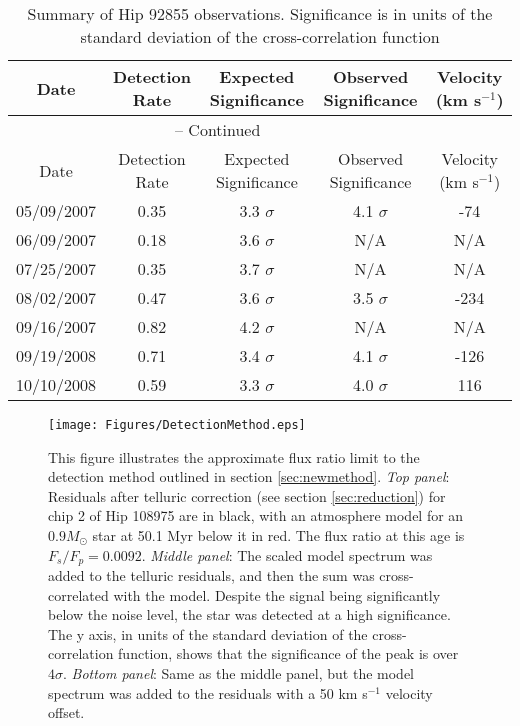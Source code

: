 \documentclass[11pt]{report}     %
\begin{document}
\begin{center}
\begin{scriptsize}
\begin{longtable}{|ccccc|}
\caption{Summary of Hip 92855 observations. Significance is in units of
  the standard deviation of the cross-correlation function} \\
\hline
Date & Detection Rate & Expected Significance & Observed Significance
& Velocity (km s$^{-1}$) \\ \hline
\endfirsthead

\multicolumn{4}{c}{{\tablename} \thetable{} -- Continued} \\
\hline
Date & Detection Rate & Expected Significance & Observed Significance
& Velocity (km s$^{-1}$) \\ \hline
\endhead

\hline
\endfoot

\hline
\endlastfoot

05/09/2007 & 0.35 & 3.3 $\sigma$ & 4.1 $\sigma$ & -74 \\
06/09/2007 & 0.18 & 3.6 $\sigma$ & N/A & N/A \\
07/25/2007 & 0.35 & 3.7 $\sigma$ & N/A & N/A \\
08/02/2007 & 0.47 & 3.6 $\sigma$ & 3.5 $\sigma$ & -234 \\
09/16/2007 & 0.82 & 4.2 $\sigma$ & N/A & N/A \\
09/19/2008 & 0.71 & 3.4 $\sigma$ & 4.1 $\sigma$ & -126 \\
10/10/2008 & 0.59 & 3.3 $\sigma$ & 4.0 $\sigma$ & 116 
\label{tab:hip92855}
\end{longtable}
\end{scriptsize}
\end{center}  
  
  



\begin{figure}[ht]
  \centering
  \texttt{[image: Figures/DetectionMethod.eps]}
  \caption{This figure illustrates the approximate flux ratio limit to
  the detection method outlined in section
  \ref{sec:newmethod}. \emph{Top panel}: Residuals after telluric
  correction (see section \ref{sec:reduction}) for chip 2 of Hip 108975 are in black, with an
  atmosphere model for an $0.9 M_{\odot}$ star at 50.1 Myr below it in
  red. The flux ratio at this age is $F_s/F_p = 0.0092$. \emph{Middle panel}: The scaled model
  spectrum was added to the telluric residuals, and then the sum was
  cross-correlated with the model. Despite the signal being
  significantly below the noise level, the star was detected at a high
significance. The y axis, in units of the standard deviation of the
cross-correlation function, shows that the significance of the peak is over
$4\sigma$. \emph{Bottom panel}: Same as the middle panel, but the
model spectrum was added to the residuals with a 50 km s$^{-1}$ velocity
offset.}
  \label{method}
\end{figure}
\end{document}
